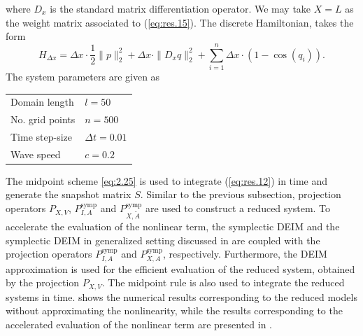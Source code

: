 where $D_x$ is the standard matrix differentiation operator. We may take $X = L$ as the weight matrix associated to (\ref{eq:res.15}). The discrete Hamiltonian, takes the form
\begin{equation} \label{eq:res.17}
	H_{\Delta x} = \Delta x \cdot \frac 1 2 \| p \|^2_2 + \Delta x \cdot \| D_x q \|^2_2 + \sum_{i=1}^{n} \Delta x \cdot ( 1 - \cos(q_i) ).
\end{equation}
The system parameters are given as
\vspace{0.5cm}
\begin{center}
\begin{tabular}{|l|l|}
\hline
Domain length & $l = 50$ \\
No. grid points & $n = 500$ \\
Time step-size & $\Delta t = 0.01$ \\
Wave speed & $c=0.2$ \\
\hline
\end{tabular}
\end{center}
\vspace{0.5cm}
The midpoint scheme \eqref{eq:2.25} is used to integrate (\ref{eq:res.12}) in time and generate the snapshot matrix $S$. Similar to the previous subsection, projection operators $P_{X,V}$, $P^{\text{symp}}_{I,A}$ and $P^{\text{symp}}_{X,\tilde A}$ are used to construct a reduced system. To accelerate the evaluation of the nonlinear term, the symplectic DEIM and the symplectic DEIM in generalized setting discussed in  are coupled with the projection operators $P^{\text{symp}}_{I,A}$ and $P^{\text{symp}}_{X,A}$, respectively. Furthermore, the DEIM approximation is used for the efficient evaluation of the reduced system, obtained by the projection $P_{X,V}$. The midpoint rule is also used to integrate the reduced systems in time.  shows the numerical results corresponding to the reduced models without approximating the nonlinearity, while the results corresponding to the accelerated evaluation of the nonlinear term are presented in .

